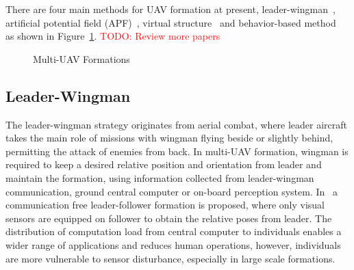There are four main methods for UAV formation at present, leader-wingman~\cite{Wingman}, artificial potential field (APF)~\cite{Martin2014,Martin2014,Saber2006}, virtual structure~\cite{Virtual2008,Askari2015} and behavior-based method~\cite{Zhang2018,Behavior2004,Reynolds1987,Vicsek2018,Martin2017,Cai2012} as shown in Figure~\ref{fig:multi_uav}. \textcolor{red}{TODO: Review more papers}
\begin{figure}[htb]
  \centering
  \caption{Multi-UAV Formations}\label{fig:multi_uav}
\end{figure}

\subsection{Leader-Wingman}
The leader-wingman strategy originates from aerial combat, where leader aircraft takes the main role of missions with wingman flying beside or slightly behind, permitting the attack of enemies from back. In multi-UAV formation, wingman is required to keep a desired relative position and orientation from leader and maintain the formation, using information collected from leader-wingman communication, ground central computer or on-board perception system. In~\cite{Wingman} a communication free leader-follower formation is proposed, where only visual sensors are equipped on follower to obtain the relative poses from leader. The distribution of computation load from central computer to individuals enables a wider range of applications and reduces human operations, however, individuals are more vulnerable to sensor disturbance, especially in large scale formations.

